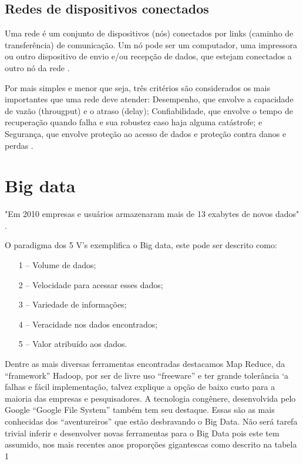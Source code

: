 \documentclass[conference,compsoc]{IEEEtran}
\begin{document}
\subsection{Redes de dispositivos conectados}
Uma rede é um conjunto de dispositivos (nós) conectados por links (caminho de transferência) de comunicação.  Um nó pode ser um computador, uma impressora ou outro dispositivo de envio e/ou recepção de dados, que estejam conectados a outro nó da rede \cite{Forouzan}.

Por mais simples e menor que seja, três critérios são considerados os mais importantes que uma rede deve atender: Desempenho, que envolve a capacidade de vazão (througput) e o atraso (delay); Confiabilidade, que envolve o tempo de recuperação quando falha e sua robustez caso haja alguma catástrofe; e Segurança, que envolve proteção ao acesso de dados e proteção contra danos e perdas \cite{Forouzan} \cite{Specialski}.



\section{Big data}

"Em 2010 empresas e usuários armazenaram mais de 13 exabytes de novos dados" \cite{bigdataQualquerUm}.

O paradigma dos 5 V’s exemplifica o Big data, este pode ser descrito como: 

\begin{enumerate}
	\item[1 --]Volume de dados;
	\item[2 --]Velocidade para acessar esses dados;
	\item[3 --]Variedade de informações;
	\item[4 --]Veracidade nos dados encontrados;
	\item[5 --]Valor atribuído aos dados.
\end{enumerate}
  
Dentre as mais diversas ferramentas encontradas destacamos Map Reduce, da ``framework'' Hadoop, por ser de livre uso ``freeware'' e ter grande tolerância `a falhas e fácil implementação, talvez explique a opção de baixo custo para a maioria das empresas e pesquisadores.
A tecnologia congênere, desenvolvida pelo Google ``Google File System'' também tem seu destaque. Essas são as mais conhecidas dos ``aventureiros'' que estão desbravando o Big Data. Não será tarefa trivial inferir e desenvolver novas ferramentas para o Big Data pois este tem 
assumido, nos mais recentes anos proporções gigantescas como descrito na tabela 1
\end{document}
